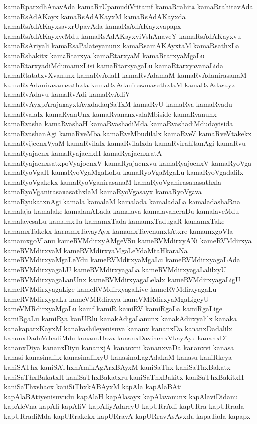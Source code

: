 {kamaRparxdhAnavAda
kamaRrUpamudiVritamf
kamaRrahita
kamaRrahitavAda
kamaRsAdAKayx
kamaRsAdAKayxM
kamaRsAdAKayxda
kamaRsAdAKayxsavxrUpavAda
kamaRsAdAKayxvapapx
kamaRsAdAKayxveMdu
kamaRsAdAKayxviVshAnaveY
kamaRsAdAKayxvu
kamaRsAriyali
kamaRsaPalateyanunx
kamaRsamAKAyxtaM
kamaRsathxLa
kamaRshakitx
kamaRtarxya
kamaRtarxyaM
kamaRtarxyaMgaLu
kamaRtarxyadiMdumamxLisi
kamaRtarxyagaLu
kamaRtarxyavanaLida
kamaRtatatxvXvanunx
kamaRvAdaH
kamaRvAdamaM
kamaRvAdanirasanaM
kamaRvAdanirasanasathxla
kamaRvAdanirasanasathxlaM
kamaRvAdasayx
kamaRvAdavu
kamaRvAdi
kamaRvAdiV
kamaRvAyxpArajanayxtAvxdadaqSaTxM
kamaRvU
kamaRva
kamaRvadu
kamaRvalalx
kamaRvanUnx
kamaRvananxvalaMbiside
kamaRvanunx
kamaRvasha
kamaRvashaH
kamaRvashadiMda
kamaRvashadiMdudayisida
kamaRvashanAgi
kamaRveMba
kamaRveMbudilalx
kamaRveV
kamaRveVtakekx
kamaRvijecnxVyaM
kamaRvilalx
kamaRvilalxda
kamaRvirahitanAgi
kamaRvu
kamaRyajacnx
kamaRyajacnxH
kamaRyajacnxratA
kamaRyajacnxsatxpoVyajocnxV
kamaRyajacnxvu
kamaRyajocnxV
kamaRyoVga
kamaRyoVgaH
kamaRyoVgaMgaLoLu
kamaRyoVgaMgaLu
kamaRyoVgadalilx
kamaRyoVgakekx
kamaRyoVganirasanaM
kamaRyoVganirasanasathxla
kamaRyoVganirasanasathxlaM
kamaRyoVgasayx
kamaRyoVgava
kamaRyukatxnAgi
kamala
kamalaM
kamalada
kamaladaLa
kamaladashaRna
kamalaja
kamalake
kamalanALada
kamalava
kamalavaneraDu
kamalaveMdu
kamalavesaLu
kamamxTa
kamamxTada
kamamxTadugaR
kamamxTake
kamamxTakekx
kamamxTavayAyx
kamamxTavenunxtAtxre
kamamxgoVla
kamamxgoVlanu
kameRVMdirxyAMgeVSu
kameRVMdirxyANi
kameRVMdirxya
kameRVMdirxyaM
kameRVMdirxyaMgaLeYdaMtaHkaraNa
kameRVMdirxyaMgaLeYdu
kameRVMdirxyaMgaLu
kameRVMdirxyagaLAda
kameRVMdirxyagaLU
kameRVMdirxyagaLa
kameRVMdirxyagaLalilxyU
kameRVMdirxyagaLanUnx
kameRVMdirxyagaLelalx
kameRVMdirxyagaLigU
kameRVMdirxyagaLige
kameRVMdirxyagaLive
kameRVMdirxyagaLu
kameRVMdirxygaLu
kameVMRdirxya
kameVMRdirxyaMgaLigeyU
kameVMRdirxyaMgaLu
kamf
kamiR
kamiRV
kamiRgaLa
kamiRgaLige
kamiRgaLu
kamiRya
kanURlu
kanakAdigaLanunx
kanakAdirxyalilx
kanaka
kanakaparxKayxM
kanakashileyenisuva
kananx
kananxDa
kananxDadalilx
kananxDadeVshadiMde
kananxDava
kananxDavinenxVkayAyx
kananxDi
kananxDiya
kananxDiyu
kananxjA
kananxni
kananxvaDa
kananxvi
kanasa
kanasi
kanasinalilx
kanasinalilxyU
kanasinoLagAdakaM
kanasu
kaniRkeya
kaniSAThx
kaniSAThxnAmikAgArxBAyxM
kaniSaThx
kaniSaThxBakatx
kaniSaThxBakatxH
kaniSaThxBakatxru
kaniSaThxBakitx
kaniSaThxBakitxH
kaniSaThxshacx
kaniSiThxkABAyxM
kapAla
kapAlaBAti
kapAlaBAtiyenisuvudu
kapAlaH
kapAlasayx
kapAlavanunx
kapAlaviDidanu
kapAleVna
kapAli
kapAliV
kapAliyAdareyU
kapURrAdi
kapURra
kapURrada
kapURradiMda
kapURrakekx
kapURravA
kapURravAsAvxdu
kapaTada
kapapx
}
